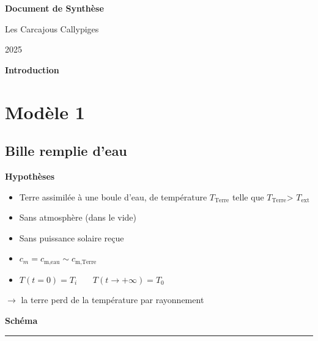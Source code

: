 \documentclass[a4paper,12pt]{article}
\begin{document}
\begin{titlepage}
    \centering
    \vspace*{3cm}
    {\Huge \textbf{Document de Synthèse}\par}
    \vspace{2cm}
    {\Large Les Carcajous Callypiges\par}
    \vfill
    {\large 2025\par}
\end{titlepage}
\tableofcontents
\newpage
{}

{\LARGE \textbf{Introduction}}
\begin{center}
  
\end{center}


\newpage
\section{Modèle 1}
\subsection{Bille remplie d'eau}
\textbf{Hypothèses}

\begin{itemize}
    \item Terre assimilée à une boule d'eau, de température \(T_{\text{Terre}}\) telle que \(T_{\text{Terre}}\)> \(T_{\text{ext}}\)
    \item  Sans atmosphère (dans le vide)
    \item  Sans puissance solaire reçue  
    \item \(c_{m}= c_{\text{m,eau}} \sim c_{\text{m,Terre}}\) 
    \item $T(t=0) = T_i$ \ \ \
$T(t \to +\infty) = T_0$
   
\end{itemize}
$\rightarrow$ la terre perd de la température par rayonnement
\\ 

\textbf{Schéma}
\\
\noindent\textcolor{gray}{\rule{\linewidth}{0.4pt}}

    
\begin{center}
  
\end{center}
\end{document}
